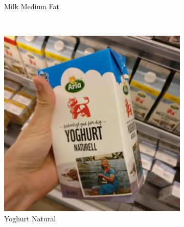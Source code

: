 \begin{figure}[t]
\begin{minipage}[b]{0.47\textwidth}
\begin{subfigure}[t]{0.32\textwidth}
			\caption{Milk Medium Fat}
			\label{subfig:real-image-q}
		\end{subfigure}~
		\begin{subfigure}[t]{0.32\textwidth}
			\centering
			\includegraphics[width=\textwidth]{PaperA/dataset-figure/Arla-Natural-Yoghurt_031.jpg}
			\caption{Yoghurt Natural}
			\label{subfig:real-image-r}
		\end{subfigure}~ 
		\captionsetup{font=footnotesize}
		\caption{Examples of natural images in our dataset, where each image have been taken inside a grocery store. Image examples of fruits, vegetables and refrigerated products are presented in each row respectively.
		}
		\label{fig:dataset-figure}
	\end{minipage}
	\hspace{10pt}
	\begin{minipage}[b]{0.47\textwidth}
		\centering
		\captionsetup{font=scriptsize}
		\begin{subfigure}[t]{0.32\textwidth}
			\centering

\end{subfigure}
\end{minipage}
\end{figure}
